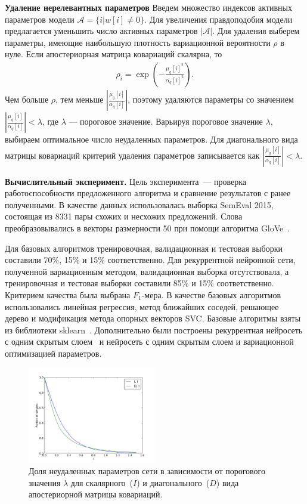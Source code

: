 \textbf{Удаление нерелевантных параметров}
Введем множество индексов активных параметров модели $\mathcal{A} = \{i | w[i] \neq 0\} $. Для увеличения правдоподобия модели предлагается уменьшить число активных параметров $|\mathcal{A}|$. Для удаления выберем параметры, имеющие наибольшую плотность вариационной вероятности $\rho$ в нуле.
Если апостериорная матрица ковариаций скалярна, то  
\begin{gather}
\rho_i = \exp\left(-\frac{\mu_{q}[i]^2}{\alpha_{q}[i]^2}\right).
\end{gather}
Чем больше $\rho$, тем меньше $|\frac{\mu_{q}[i]}{\alpha_{q}[i]}|$, поэтому удаляются параметры со значением $|\frac{\mu_{q}[i]}{\alpha_{q}[i]}| < \lambda$, где $\lambda$ --- пороговое значение. Варьируя пороговое значение $\lambda$, выбираем оптимальное число неудаленных параметров.
Для диагонального вида матрицы ковариаций критерий удаления параметров записывается как $|\frac{\mu_{q}[i]}{\alpha_{q}[i]}| < \lambda$.

\textbf{Вычислительный эксперимент. }
Цель эксперимента~--- проверка работоспособности предложенного алгоритма и сравнение результатов с ранее полученными. В качестве данных использовалась выборка SemEval 2015, состоящая из 8331 пары схожих и несхожих предложений. Слова преобразовывались в векторы размерности 50 при помощи алгоритма GloVe~\cite{glove}.

Для базовых алгоритмов тренировочная, валидационная и тестовая выборки составили 70\%, 15\% и 15\% соответственно.
Для рекуррентной нейронной сети, полученной вариационным методом, валидационная выборка отсутствовала, а тренировочная и тестовая выборки составили 85\% и 15\% соответственно.
Критерием качества была выбрана $F_1$-мера.
В качестве базовых алгоритмов использовались линейная регрессия, метод ближайших соседей, решающее дерево и модификация метода опорных векторов SVC. Базовые алгоритмы взяты из библиотеки sklearn~\cite{sklearn}. 
Дополнительно были построены рекуррентная нейросеть с одним скрытым слоем~\cite{sanborn} и нейросеть с одним скрытым слоем и вариационной оптимизацией параметров.


\begin{figure}[!h]
	\centering
	\includegraphics[width=0.5\textwidth]{plots/smerdov/lambdas.pdf}
	\caption{Доля неудаленных параметров сети в зависимости от порогового значения $\lambda$ для скалярного~($I$) и диагонального~($D$) вида апостериорной матрицы ковариаций.}
	\label{lambdas}
\end{figure}

